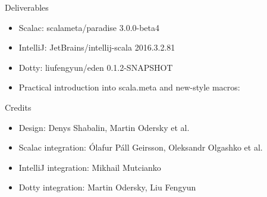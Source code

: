 \documentclass[svgnames,dvipsnames,hyperref={bookmarks=false},usepdftitle=false]{beamer}
\begin{document}
\begin{frame}{Deliverables}
\begin{itemize}
\item Scalac: scalameta/paradise 3.0.0-beta4
\item IntelliJ: JetBrains/intellij-scala 2016.3.2.81
\item Dotty: liufengyun/eden 0.1.2-SNAPSHOT
\item Practical introduction into scala.meta and new-style macros:
\end{itemize}
\end{frame}

\begin{frame}{Credits}
\begin{itemize}
\item Design: Denys Shabalin, Martin Odersky et al.
\item Scalac integration: \'{O}lafur P\'{a}ll Geirsson, Oleksandr Olgashko et al.
\item IntelliJ integration: Mikhail Mutcianko
\item Dotty integration: Martin Odersky, Liu Fengyun
\end{itemize}
\end{frame}

\end{document}
